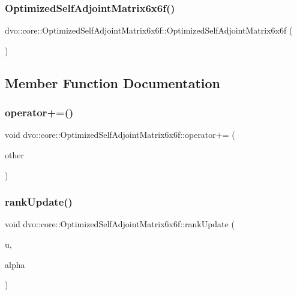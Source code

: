 \subsubsection{\texorpdfstring{Optimized\+Self\+Adjoint\+Matrix6x6f()}{OptimizedSelfAdjointMatrix6x6f()}}
{\footnotesize\ttfamily dvo\+::core\+::\+Optimized\+Self\+Adjoint\+Matrix6x6f\+::\+Optimized\+Self\+Adjoint\+Matrix6x6f (\begin{DoxyParamCaption}{ }\end{DoxyParamCaption})}



\subsection{Member Function Documentation}
\mbox{\label{classdvo_1_1core_1_1_optimized_self_adjoint_matrix6x6f_aba5627b7a649121f67fa7ba8b8bdc853}} 
\subsubsection{\texorpdfstring{operator+=()}{operator+=()}}
{\footnotesize\ttfamily void dvo\+::core\+::\+Optimized\+Self\+Adjoint\+Matrix6x6f\+::operator+= (\begin{DoxyParamCaption}\item[{const \mbox{\hyperlink{classdvo_1_1core_1_1_optimized_self_adjoint_matrix6x6f}{Optimized\+Self\+Adjoint\+Matrix6x6f}} \&}]{other }\end{DoxyParamCaption})}

\mbox{\label{classdvo_1_1core_1_1_optimized_self_adjoint_matrix6x6f_a37a35da097b4bf2acbdbc5940c0742c8}} 
\subsubsection{\texorpdfstring{rank\+Update()}{rankUpdate()}}
{\footnotesize\ttfamily void dvo\+::core\+::\+Optimized\+Self\+Adjoint\+Matrix6x6f\+::rank\+Update (\begin{DoxyParamCaption}\item[{const Eigen\+::\+Matrix$<$ float, 6, 1 $>$ \&}]{u,  }\item[{const float \&}]{alpha }\end{DoxyParamCaption})}


